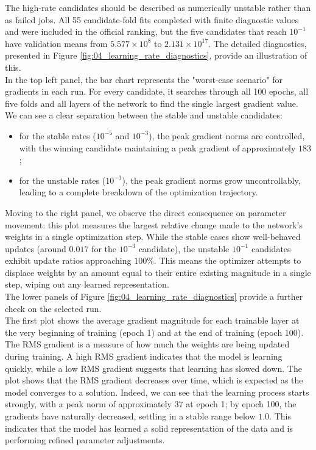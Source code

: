 The high-rate candidates should be described as numerically unstable rather than as failed jobs. All 55 candidate-fold fits completed with finite diagnostic values and were included in the official ranking, but the five candidates that reach $10^{-1}$ have validation means from $5.577\times10^8$ to $2.131\times10^{17}$. The detailed diagnostics, presented in Figure \ref{fig:04_learning_rate_diagnostics}, provide an illustration of this.\\

In the top left panel, the bar chart represents the "worst-case scenario" for gradients in each run. For every candidate, it searches through all 100 epochs, all five folds and all layers of the network to find the single largest gradient value. We can see a clear separation between the stable and unstable candidates:
\begin{itemize}
    \item[-] for the stable rates ($10^{-5}$ and $10^{-3}$), the peak gradient norms are controlled, with the winning candidate maintaining a peak gradient of approximately $183$;
    \item[-] for the unstable rates ($10^{-1}$), the peak gradient norms grow uncontrollably, leading to a complete breakdown of the optimization trajectory.
\end{itemize}
Moving to the right panel, we observe the direct consequence on parameter movement: this plot measures the largest relative change made to the network's weights in a single optimization step. While the stable cases show well-behaved updates (around $0.017$ for the $10^{-3}$ candidate), the unstable $10^{-1}$ candidates exhibit update ratios approaching $100\%$. This means the optimizer attempts to displace weights by an amount equal to their entire existing magnitude in a single step, wiping out any learned representation.\\

The lower panels of Figure \ref{fig:04_learning_rate_diagnostics} provide a further check on the selected run.\\

The first plot shows the average gradient magnitude for each trainable layer at the very beginning of training (epoch 1) and at the end of training (epoch 100). The RMS gradient is a measure of how much the weights are being updated during training. A high RMS gradient indicates that the model is learning quickly, while a low RMS gradient suggests that learning has slowed down. The plot shows that the RMS gradient decreases over time, which is expected as the model converges to a solution. Indeed, we can see that the learning process starts strongly, with a peak norm of approximately $37$ at epoch 1; by epoch 100, the gradients have naturally decreased, settling in a stable range below $1.0$. This indicates that the model has learned a solid representation of the data and is performing refined parameter adjustments.\\

